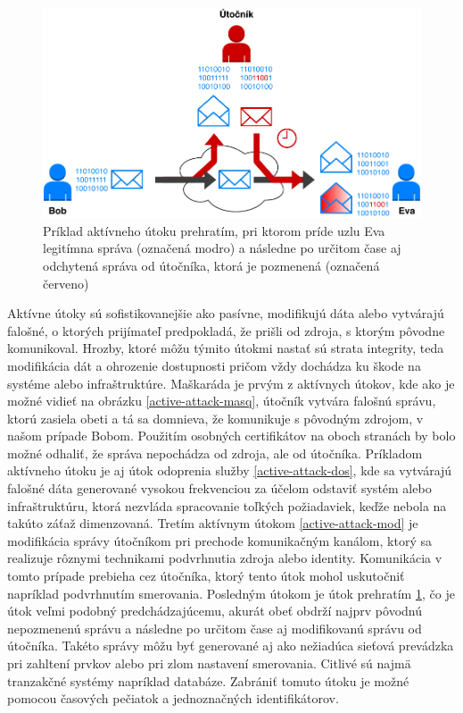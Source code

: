 \begin{figure}[H]
	\begin{center}
		\includegraphics[scale=0.55]{obrazky/active-attack-reply.pdf}
	\end{center}
	\caption[Aktívny útok prehratím]{Príklad aktívneho útoku prehratím, pri ktorom príde uzlu Eva legitímna správa (označená modro) a následne po určitom čase aj odchytená správa od útočníka, ktorá je pozmenená (označená červeno) \cite{Stallings2011}}
	\label{active-attack-reply}
\end{figure}


Aktívne útoky sú sofistikovanejšie ako pasívne, modifikujú dáta alebo vytvárajú falošné, o ktorých prijímateľ predpokladá, že prišli od zdroja, s ktorým pôvodne komunikoval. Hrozby, ktoré môžu týmito útokmi nastať sú strata integrity, teda modifikácia dát a ohrozenie dostupnosti pričom vždy dochádza ku škode na systéme alebo infraštruktúre. Maškaráda je prvým z aktívnych útokov, kde ako je možné vidieť na obrázku \ref{active-attack-masq}, útočník vytvára falošnú správu, ktorú zasiela obeti a tá sa domnieva, že komunikuje s pôvodným zdrojom, v našom prípade Bobom. Použitím osobných certifikátov na oboch stranách by bolo možné odhaliť, že správa nepochádza od zdroja, ale od útočníka. Príkladom aktívneho útoku je aj útok odoprenia služby \ref{active-attack-dos}, kde sa vytvárajú falošné dáta generované vysokou frekvenciou za účelom odstaviť systém alebo infraštruktúru, ktorá nezvláda spracovanie toľkých požiadaviek, keďže nebola na takúto záťaž dimenzovaná. Tretím aktívnym útokom \ref{active-attack-mod} je modifikácia správy útočníkom pri prechode komunikačným kanálom, ktorý sa realizuje rôznymi technikami podvrhnutia zdroja alebo identity. Komunikácia v tomto prípade prebieha cez útočníka, ktorý tento útok mohol uskutočniť napríklad podvrhnutím smerovania. Posledným útokom je útok prehratím \ref{active-attack-reply}, čo je útok veľmi podobný predchádzajúcemu, akurát obeť obdrží najprv pôvodnú nepozmenenú správu a následne po určitom čase aj modifikovanú správu od útočníka. Takéto správy môžu byť generované aj ako nežiadúca sieťová prevádzka pri zahltení prvkov alebo pri zlom nastavení smerovania. Citlivé sú najmä tranzakčné systémy napríklad databáze. Zabrániť tomuto útoku je možné pomocou časových pečiatok a jednoznačných identifikátorov. 




